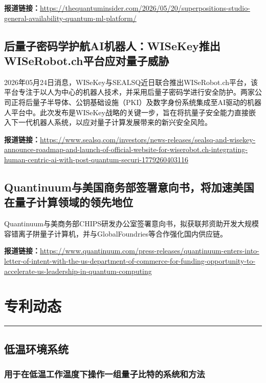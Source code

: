 \documentclass[12pt,a4paper]{ctexart}
\begin{document}
\noindent\textbf{报道链接：}\url{https://thequantuminsider.com/2026/05/20/superpositions-studio-general-availability-quantum-ml-platform/}

\subsection{ 后量子密码学护航AI机器人：WISeKey推出WISeRobot.ch平台应对量子威胁 }

2026年05月24日消息，WISeKey与SEALSQ近日联合推出WISeRobot.ch平台，该平台专注于以人为中心的机器人技术，并采用后量子密码学进行安全防护。两家公司正将后量子半导体、公钥基础设施（PKI）及数字身份系统集成至AI驱动的机器人平台中。此次发布是WISeKey战略的关键一步，旨在将抗量子安全能力直接嵌入下一代机器人系统，以应对量子计算发展带来的新兴安全风险。

\noindent\textbf{报道链接：}\url{https://www.sealsq.com/investors/news-releases/sealsq-and-wisekey-announce-roadmap-and-launch-of-official-website-for-wiserobot.ch-integrating-human-centric-ai-with-post-quantum-securi-1779260403116}

\subsection{ Quantinuum与美国商务部签署意向书，将加速美国在量子计算领域的领先地位 }

Quantinuum与美商务部CHIPS研发办公室签署意向书，拟获联邦资助开发大规模容错离子阱量子计算机，并与GlobalFoundries等合作强化国内供应链。

\noindent\textbf{报道链接：}\url{https://www.quantinuum.com/press-releases/quantinuum-enters-into-letter-of-intent-with-the-us-department-of-commerce-for-funding-opportunity-to-accelerate-us-leadership-in-quantum-computing}



\newpage
\section{专利动态}
\vspace{-0.5em}
\noindent\rule{\linewidth}{1.5pt}

\subsection{ 低温环境系统 }

\subsubsection{ 用于在低温工作温度下操作一组量子比特的系统和方法 }
\end{document}
